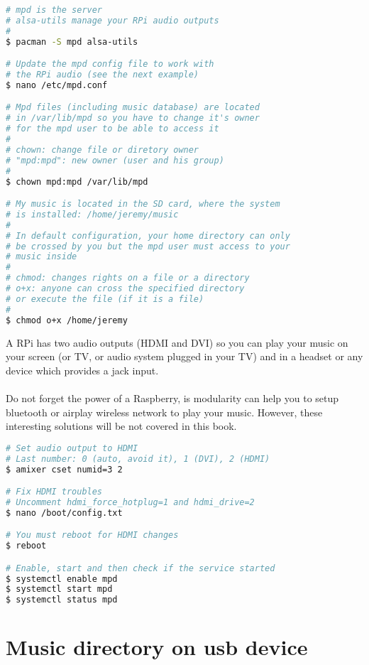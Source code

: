 \begin{lstlisting}[language=bash,caption=Install mpd server]
# mpd is the server
# alsa-utils manage your RPi audio outputs
#
$ pacman -S mpd alsa-utils

# Update the mpd config file to work with
# the RPi audio (see the next example)
$ nano /etc/mpd.conf

# Mpd files (including music database) are located
# in /var/lib/mpd so you have to change it's owner
# for the mpd user to be able to access it
#
# chown: change file or diretory owner
# "mpd:mpd": new owner (user and his group)
#
$ chown mpd:mpd /var/lib/mpd

# My music is located in the SD card, where the system
# is installed: /home/jeremy/music
#
# In default configuration, your home directory can only 
# be crossed by you but the mpd user must access to your
# music inside
#
# chmod: changes rights on a file or a directory
# o+x: anyone can cross the specified directory
# or execute the file (if it is a file)
#
$ chmod o+x /home/jeremy
\end{lstlisting} 

\lstset{language=bash,caption=Mpd configuration file,label=listing:MpdConfigFile}


A RPi has two audio outputs (HDMI and DVI) so you can play your music on your 
screen (or TV, or audio system plugged in your TV) and in a headset or any device 
which provides a jack input. 
\\\\
Do not forget the power of a Raspberry, is modularity can help you to setup 
bluetooth or airplay wireless network to play your music. However, these 
interesting solutions will be not covered in this book.
\\
\begin{lstlisting}[language=bash,caption=Set audio output]
# Set audio output to HDMI
# Last number: 0 (auto, avoid it), 1 (DVI), 2 (HDMI)
$ amixer cset numid=3 2

# Fix HDMI troubles
# Uncomment hdmi_force_hotplug=1 and hdmi_drive=2
$ nano /boot/config.txt

# You must reboot for HDMI changes
$ reboot

# Enable, start and then check if the service started
$ systemctl enable mpd
$ systemctl start mpd
$ systemctl status mpd
\end{lstlisting}

\section{Music directory on usb device}
